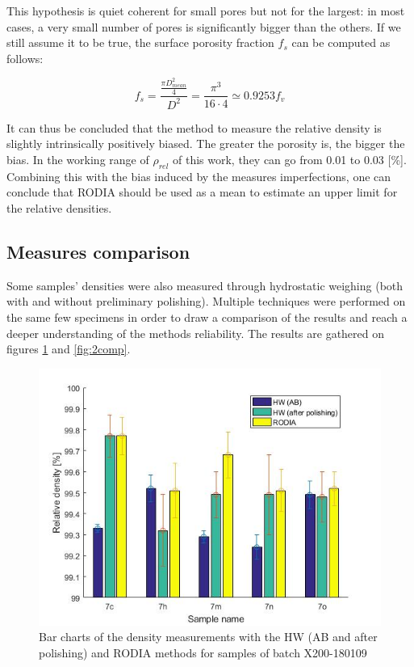 This hypothesis is quiet coherent for small pores but not  for the largest: in most cases, a very small number of pores is significantly bigger than the others. If we still assume it to be true, the surface porosity fraction $f_s$ can be computed as follows:

$$f_s=\frac{\frac{\pi D_{mean}^2}{4}}{D^2}=\frac{\pi^3}{16 \cdot 4} \simeq 0.9253 f_v$$

It can thus be concluded that the method to measure the relative density is slightly intrinsically positively biased. The greater the porosity is, the bigger the bias. In the working range of $\rho_{rel}$ of this work, they can go from 0.01 to 0.03 [\%]. Combining this with the bias induced by the measures imperfections, one can conclude that RODIA should be used as a mean to estimate an upper limit for the relative densities.

\subsection{Measures comparison}
Some samples' densities were also measured through hydrostatic weighing (both with and without preliminary polishing). Multiple techniques were performed on the same few specimens in order to draw a comparison of the results and reach a deeper understanding of the methods reliability. The results are gathered on figures \ref{fig:7comp} and \ref{fig:2comp}.\\

\begin{figure}[ht]
	\centering
	\centerline{\includegraphics[scale=0.64]{Images/7comp}}
	\decoRule
	\caption[Bar chart of the density measurements with the HW (AB and after polishing) and RODIA methods for samples of batch X200-180109]{Bar charts of the density measurements with the HW (AB and after polishing) and RODIA methods for samples of batch X200-180109}
	\label{fig:7comp}
\end{figure}

